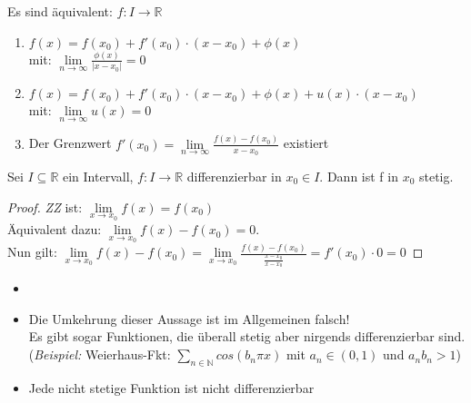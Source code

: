 \setcounter{Satz}{1} 
\setcounter{Definition}{5}

\begin{Satz}{
	Es sind äquivalent: $f : I \rightarrow \mathbb{R}$
	\begin{enumerate}
		\item $f(x) = f(x_0) + f'(x_0) \cdot (x-x_0) + \phi(x) $\\
		 mit: $\lim\limits_{n \rightarrow \infty}{\frac{\phi(x)}{|x-x_0|}} = 0$
	\item $ f(x) = f(x_0) + f'(x_0) \cdot (x-x_0) + \phi(x) + u(x)  \cdot (x-x_0)$ \\
	mit: $\lim\limits_{n \rightarrow \infty}{u(x)} = 0$
	\item Der Grenzwert 
	$f'(x_0) = \lim\limits_{n \rightarrow \infty}{\frac{f(x)-f(x_0)}{x-x_0}}$ 	
	existiert
	\end{enumerate}
}\end{Satz}

\begin{Satz}{\label{satz:satz_3}
	Sei $ I \subseteq \mathbb{R}$ ein Intervall, $f: I \rightarrow \mathbb{R}$ 
	differenzierbar in $x_0 \in I$. Dann ist f in $x_0$ stetig.
}\end{Satz}

\begin{proof}
	\textit{ZZ}  ist: $\lim\limits_{x \rightarrow x_0}{f(x) = f(x_0)}$ \\
		\noindent\hspace*{10mm}
		Äquivalent dazu: $\lim\limits_{x \rightarrow x_0}{f(x)-f(x_0) = 0}$. \\
		\noindent\hspace*{10mm}
		Nun gilt: $\lim\limits_{x \rightarrow x_0}{f(x) - f(x_0)} = 
	 \lim\limits_{x \rightarrow x_0}{\frac{f(x)-f(x_0)}{\frac{x-x_0}{x-x_0}}}
	 = f'(x_0) \cdot 0 = 0 $
\end{proof}
		
\begin{Bemerkung}{
	 \begin{itemize}
	 	\item[ ]
	 	\item Die Umkehrung dieser Aussage ist im Allgemeinen falsch! \\
	 	Es gibt sogar Funktionen, die überall stetig aber nirgends 
	 	differenzierbar sind. \\
	 	(\textit{Beispiel:} Weierhaus-Fkt: $\sum_{n \in \mathbb{N}} cos(b_n \pi x)$
	 	mit $a_n \in (0,1)$ und $a_n b_n >1$)
	 	\item Jede nicht stetige Funktion ist nicht differenzierbar
	 \end{itemize}	 
}\end{Bemerkung}

